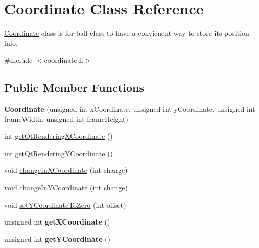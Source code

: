 \hypertarget{class_coordinate}{}\section{Coordinate Class Reference}
\label{class_coordinate}


\mbox{\hyperlink{class_coordinate}{Coordinate}} class is for ball class to have a convienent way to store its position info.  




{\ttfamily \#include $<$coordinate.\+h$>$}

\subsection*{Public Member Functions}
\begin{DoxyCompactItemize}
\item 
\mbox{\label{class_coordinate_a2abcffb39c9db2c4c69bc5d240d1105f}} 
{\bfseries Coordinate} (unsigned int x\+Coordinate, unsigned int y\+Coordinate, unsigned int frame\+Width, unsigned int frame\+Height)
\item 
int \mbox{\hyperlink{class_coordinate_adb2d33e506b944b74cb45657152a6948}{get\+Qt\+Rendering\+X\+Coordinate}} ()
\item 
int \mbox{\hyperlink{class_coordinate_a3f71047bac34b137a58a6dcc5ab69df4}{get\+Qt\+Rendering\+Y\+Coordinate}} ()
\item 
void \mbox{\hyperlink{class_coordinate_a8481ba6f79f9b7f6ac41a28119d251b9}{change\+In\+X\+Coordinate}} (int change)
\item 
void \mbox{\hyperlink{class_coordinate_ad2cd26113f8101771bea445fb5dc907f}{change\+In\+Y\+Coordinate}} (int change)
\item 
void \mbox{\hyperlink{class_coordinate_a1ab7964582737b9bd19788e08a8a8c6b}{set\+Y\+Coordinate\+To\+Zero}} (int offset)
\item 
\mbox{\label{class_coordinate_a1acb338ca5f143627f876e4dd6b8c93a}} 
unsigned int {\bfseries get\+X\+Coordinate} ()
\item 
\mbox{\label{class_coordinate_ab7adec413c90e64f87592d9dd563f0c9}} 
unsigned int {\bfseries get\+Y\+Coordinate} ()
\item 
\mbox{\label{class_coordinate_ad39f3c1849a18c340c254d5e71093f98}} 

\end{DoxyCompactItemize}
